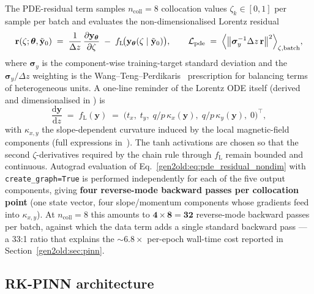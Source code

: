 \documentclass[a4paper,11pt]{article}
\newcommand{\qop}{q/p}
\newcommand{\dz}{\Delta z}
\newcommand{\state}{\mathbf{y}}
\newcommand{\loss}{\mathcal{L}}
\newcommand{\btheta}{\bm{\theta}}
\begin{document}
The PDE-residual term samples $n_{\mathrm{coll}}=8$ collocation values
$\zeta_k\in[0,1]$ per sample per batch and evaluates the non-dimensionalised
Lorentz residual
\begin{equation}\label{gen2old:eq:pde_residual_nondim}
  \mathbf{r}(\zeta;\btheta,\tilde{\state}_0)
  \;=\;
  \frac{1}{\dz}\,\frac{\partial \state_{\btheta}}{\partial \zeta}
  \;-\;
  f_{\mathrm{L}}\!\bigl(\state_{\btheta}(\zeta\mid\tilde{\state}_0)\bigr),
  \qquad
  \loss_{\mathrm{pde}}
  \;=\;
  \Bigl\langle \bigl\|\bm{\sigma}_y^{-1}\dz\,\mathbf{r}\bigr\|^2\Bigr\rangle_{\zeta,\mathrm{batch}},
\end{equation}
where $\bm{\sigma}_y$ is the component-wise training-target standard deviation
and the $\bm{\sigma}_y/\dz$ weighting is the
Wang--Teng--Perdikaris~\cite{wang2021ntk} prescription for balancing terms of
heterogeneous units. A one-line reminder of the Lorentz ODE itself
(derived and dimensionalised in \cite{gen1report}) is
\begin{equation}\label{gen2old:eq:lorentz_ode}
  \frac{\mathrm{d}\state}{\mathrm{d}z}
  \;=\;
  f_{\mathrm{L}}(\state)
  \;=\;
  \bigl(t_x,\;t_y,\;\qop\,\kappa_x(\state),\;\qop\,\kappa_y(\state),\;0\bigr)^\top,
\end{equation}
with $\kappa_{x,y}$ the slope-dependent curvature induced by the local
magnetic-field components (full expressions in~\cite{gen1report}).
The tanh activations are chosen so that the
second $\zeta$-derivatives required by the chain rule through
$f_{\mathrm{L}}$ remain bounded and continuous. Autograd evaluation of
Eq.~\ref{gen2old:eq:pde_residual_nondim} with
\texttt{create\_graph=True} is performed independently for each of the five
output components, giving \textbf{four reverse-mode backward passes per
collocation point} (one state vector, four slope/momentum components whose
gradients feed into $\kappa_{x,y}$). At
$n_{\mathrm{coll}}=8$ this amounts to
$\mathbf{4\times 8 = 32}$ reverse-mode backward passes per batch, against
which the data term adds a single standard backward pass --- a 33:1 ratio
that explains the $\sim\!6.8\times$ per-epoch wall-time cost reported
in Section~\ref{gen2old:sec:pinn}.

\subsection{RK-PINN architecture}\label{gen2old:sub:rkpinn_arch}
\end{document}

